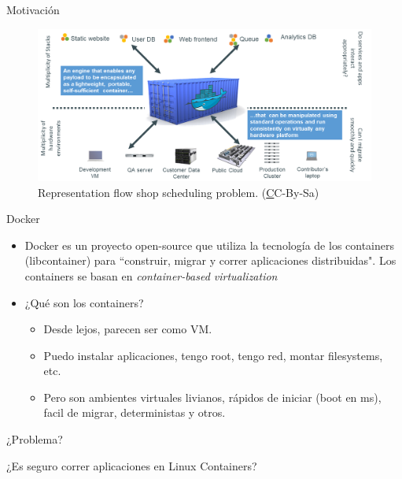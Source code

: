 \documentclass{bredelebeamer}
\begin{document}
\begin{frame}{Motivación}
	\begin{figure}
		\centering
\includegraphics[width=\textwidth,height=0.8\textheight,keepaspectratio]{images/shipping-container-for-code}
		\caption{Representation flow shop scheduling problem. (\href{http://yetanothermathprogrammingconsultant.blogspot.com/2012_04_01_archive.html} CC-By-Sa)}
	\end{figure}
\end{frame}

\begin{frame}{Docker}
	\begin{itemize}
		\item 	Docker es un proyecto open-source que utiliza la tecnología de los containers (libcontainer) para ``construir, migrar y correr aplicaciones distribuidas". Los containers se basan en \textit{container-based virtualization} 
		\item ¿Qué son los containers?
			\begin{itemize}
				\item Desde lejos, parecen ser como VM.
				\item Puedo instalar aplicaciones, tengo root, tengo red, montar filesystems, etc.
				\item Pero son ambientes virtuales livianos, rápidos de iniciar (boot en ms), facil de migrar, deterministas y otros.
			\end{itemize}
	\end{itemize}

\end{frame}


\begin{frame}{¿Problema?}
	
¿Es seguro correr aplicaciones en Linux Containers?
\end{frame}
\end{document}
